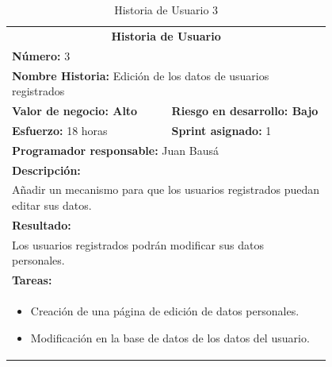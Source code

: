 	\begin{table}[H]
	  \centering 
	 	\begin{tabular}{p{0.4\linewidth}p{0.4\linewidth}}
	    \toprule
	    \multicolumn{2}{c}{\cellcolor{black!30}\textbf{Historia de Usuario}} 													\\
		\multicolumn{2}{l}{\cellcolor{gray!25}\textbf{Número: }3}																\\
		\multicolumn{2}{l}{\textbf{Nombre Historia: } Edición de los datos de usuarios registrados}							\\
		\cellcolor{gray!25}\textbf{Valor de negocio: Alto}	&	\cellcolor{gray!25}\textbf{Riesgo en desarrollo: Bajo}			\\
		\textbf{Esfuerzo:} 18 horas				&	\textbf{Sprint asignado: }1 												\\
		\multicolumn{2}{l}{\cellcolor{gray!25}\textbf{Programador responsable: }Juan Bausá}									\\
		\multicolumn{2}{l}{\textbf{Descripción:}}                                                     						\\
		\multicolumn{2}{l}{	Añadir un mecanismo para que los usuarios registrados puedan editar sus datos.} 					\\
		\multicolumn{2}{l}{\cellcolor{gray!25}\textbf{Resultado:}}																\\
		\multicolumn{2}{l}{Los usuarios registrados podrán modificar sus datos personales.} 									\\
		\multicolumn{2}{l}{\textbf{Tareas:}}																					\\
		\multicolumn{2}{l}{
			\begin{minipage}{5in}
	    		\vskip 4pt
	    		\begin{itemize}
	    			\item Creación de una página de edición de datos personales.
	    			\item Modificación en la base de datos de los datos del usuario.
				\end{itemize}
			  	\vskip 4pt
		 	\end{minipage}
		} \\																				
	    \hline
	  \end{tabular}
	  \caption{Historia de Usuario 3}
	\end{table}


